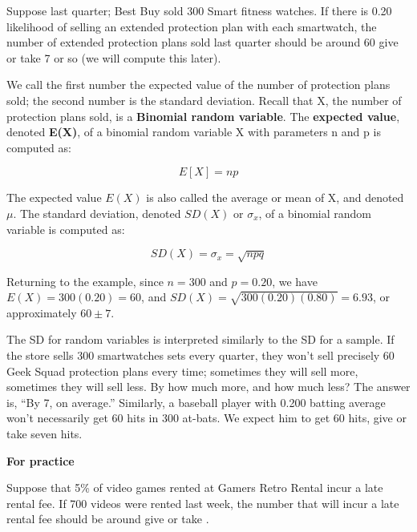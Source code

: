 \documentclass[11pt]{book}\usepackage[]{graphicx}\usepackage[]{color}
\begin{document}
Suppose last quarter; Best Buy sold 300 Smart fitness watches.  If there is 0.20 likelihood of selling an extended protection plan with each smartwatch, the number of extended protection plans sold last quarter should be around 60 give or take 7 or so (we will compute this later).

We call the first number the expected value of the number of protection plans sold; the second number is the standard deviation.  Recall that X, the number of protection plans sold, is a \textbf{Binomial random variable}.  The \textbf{expected value}, denoted \textbf{E(X)}, of a binomial random variable X with parameters n and p is computed as:

\begin{equation*}
E[ X ] = np
\end{equation*}

The expected value $E(X)$ is also called the average or mean of X, and denoted $\mu$.  The standard deviation, denoted $SD(X)$ or $\sigma_x$, of a binomial random variable is computed as:

\begin{equation*}
SD(X) = \sigma_x = \sqrt{npq}
\end{equation*}

Returning to the example, since $n = 300$ and $p = 0.20$, we have $E(X) = 300(0.20) = 60$, and $SD(X) = \sqrt{300(0.20)(0.80)} = 6.93$, or approximately $60 \pm 7$.

The SD for random variables is interpreted similarly to the SD for a sample.  If the store sells 300 smartwatches sets every quarter, they won't sell precisely 60 Geek Squad protection plans every time; sometimes they will sell more, sometimes they will sell less.   By how much more, and how much less?  The answer is, ``By 7, on average.''   Similarly, a baseball player with 0.200 batting average won't necessarily get 60 hits in 300 at-bats.  We expect him to get 60 hits, give or take seven hits.

\begin{minipage}[ht]{29mm}

\textbf{For practice}
\end{minipage}
\begin{minipage}[ht]{119mm}

Suppose that 5\% of video games rented at Gamers Retro Rental incur a late rental fee. If 700 videos were rented last week, the number that will incur a late rental fee should be around \underline{\phantom{xxxxxxxxxx}} give or take \underline{\phantom{xxxxxxxxxx}}.

\end{minipage}
\end{document}
